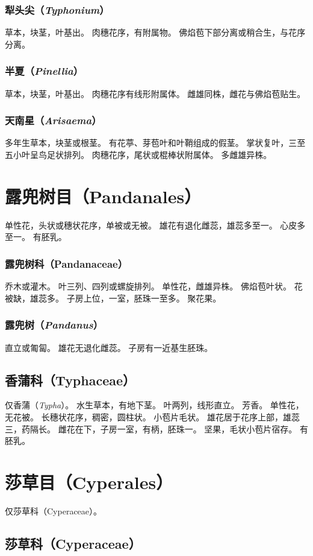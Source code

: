 \documentclass[11pt]{article}
\begin{document}
\begin{sloppypar}
\subsubsection{犁头尖（\textit{Typhonium}）}
草本，块茎，叶基出。
肉穗花序，有附属物。
佛焰苞下部分离或稍合生，与花序分离。

\subsubsection{半夏（\textit{Pinellia}）}
草本，块茎，叶基出。
肉穗花序有线形附属体。
雌雄同株，雌花与佛焰苞贴生。

\subsubsection{天南星（\textit{Arisaema}）}
多年生草本，块茎或根茎。
有花葶、芽苞叶和叶鞘组成的假茎。
掌状复叶，三至五小叶呈鸟足状排列。
肉穗花序，尾状或棍棒状附属体。
多雌雄异株。

\section{露兜树目（Pandanales）}
单性花，头状或穗状花序，单被或无被。
雄花有退化雌蕊，雄蕊多至一。
心皮多至一。
有胚乳。

\subsubsection{露兜树科（Pandanaceae）}
乔木或灌木。
叶三列、四列或螺旋排列。
单性花，雌雄异株。
佛焰苞叶状。
花被缺，雄蕊多。
子房上位，一室，胚珠一至多。
聚花果。

\subsubsection{露兜树（\textit{Pandanus}）}
直立或匍匐。
雄花无退化雌蕊。
子房有一近基生胚珠。

\subsection{香蒲科（Typhaceae）}
仅香蒲（\textit{Typha}）。
水生草本，有地下茎。
叶两列，线形直立。
芳香。
单性花，无花被。
长穗状花序，稠密，圆柱状。
小苞片毛状。
雄花居于花序上部，雄蕊三，药隔长。
雌花在下，子房一室，有柄，胚珠一。
坚果，毛状小苞片宿存。
有胚乳。

\section{莎草目（Cyperales）}
仅莎草科（Cyperaceae）。

\subsection{莎草科（Cyperaceae）}

\end{sloppypar}
\end{document}
